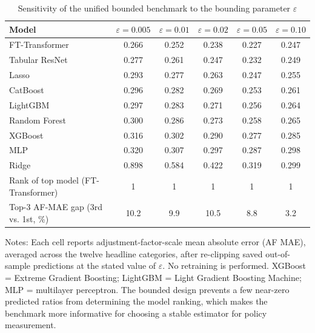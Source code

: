 \documentclass[preprint,12pt,authoryear]{elsarticle}
\begin{document}
\begin{table}[htbp]
\centering
\begin{threeparttable}
\caption{Sensitivity of the unified bounded benchmark to the bounding parameter $\varepsilon$}
\label{tab:eps_sensitivity}
\small
\setlength{\tabcolsep}{0pt} 
\begin{tabular*}{\textwidth}{@{\extracolsep{\fill}} l ccccc @{}}
\toprule
Model & $\varepsilon=0.005$ & $\varepsilon=0.01$ & $\varepsilon=0.02$ & $\varepsilon=0.05$ & $\varepsilon=0.10$ \\
\midrule
FT-Transformer  & 0.266 & 0.252 & 0.238 & 0.227 & 0.247 \\
Tabular ResNet  & 0.277 & 0.261 & 0.247 & 0.232 & 0.249 \\
Lasso           & 0.293 & 0.277 & 0.263 & 0.247 & 0.255 \\
CatBoost        & 0.296 & 0.282 & 0.269 & 0.253 & 0.261 \\
LightGBM        & 0.297 & 0.283 & 0.271 & 0.256 & 0.264 \\
Random Forest   & 0.300 & 0.286 & 0.273 & 0.258 & 0.265 \\
XGBoost         & 0.316 & 0.302 & 0.290 & 0.277 & 0.285 \\
MLP             & 0.320 & 0.307 & 0.297 & 0.287 & 0.298 \\
Ridge           & 0.898 & 0.584 & 0.422 & 0.319 & 0.299 \\
\midrule
\addlinespace
Rank of top model (FT-Transformer) & 1 & 1 & 1 & 1 & 1 \\
Top-3 AF-MAE gap (3rd vs. 1st, \%) & 10.2 & 9.9 & 10.5 & 8.8 & 3.2 \\
\bottomrule
\end{tabular*}
\begin{tablenotes}[flushleft]
\scriptsize
\item Notes: Each cell reports adjustment-factor-scale mean absolute error (AF MAE), averaged across the twelve headline categories, after re-clipping saved out-of-sample predictions at the stated value of $\varepsilon$. No retraining is performed. XGBoost = Extreme Gradient Boosting; LightGBM = Light Gradient Boosting Machine; MLP = multilayer perceptron. The bounded design prevents a few near-zero predicted ratios from determining the model ranking, which makes the benchmark more informative for choosing a stable estimator for policy measurement.
\end{tablenotes}
\end{threeparttable}
\end{table}
\end{document}
